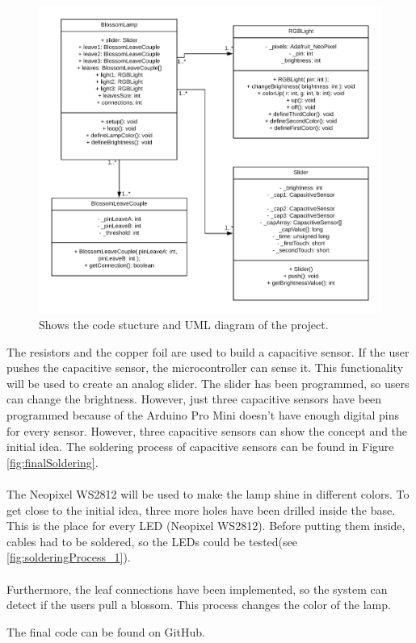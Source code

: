 \documentclass[04_projectProcess.tex]{subfiles}
\begin{document}
\begin{flushleft}
        \begin{figure}[H]
            \centering
            \includegraphics[width=0.8\linewidth]{images/programmingProcess/BlossomLamp_UML.png}
            \caption{Shows the code stucture and UML diagram of the project.}
            \label{fig:UMLDiagram}
        \end{figure}

        \noindent
        The resistors and the copper foil are used to build a capacitive sensor. \cite{Badger2019} 
        If the user pushes the capacitive sensor, the microcontroller can sense it. This functionality
        will be used to create an analog slider. The slider has been programmed, so users can change the 
        brightness. However, just three capacitive sensors have been programmed because of the Arduino 
        Pro Mini doesn't have enough digital pins for every sensor. However, three capacitive sensors can show 
        the concept and the initial idea. The soldering process of capacitive sensors can be found in 
        Figure \ref{fig:finalSoldering}. \\~\\

        \noindent
        The Neopixel WS2812 will be used to make the lamp shine in different colors. \cite{Burgess2019} 
        To get close to the initial idea, three more holes have been drilled inside the base. 
        This is the place for every LED (Neopixel WS2812). Before putting them inside, cables had to be 
        soldered, so the LEDs could be tested(see \ref{fig:solderingProcess_1}).\\~\\

        \noindent
        Furthermore, the leaf connections have been implemented, so the system can detect if 
        the users pull a blossom. This process changes the color of the lamp.

        \noindent
        The final code can be found on GitHub. %
    \end{flushleft}
\end{document}
